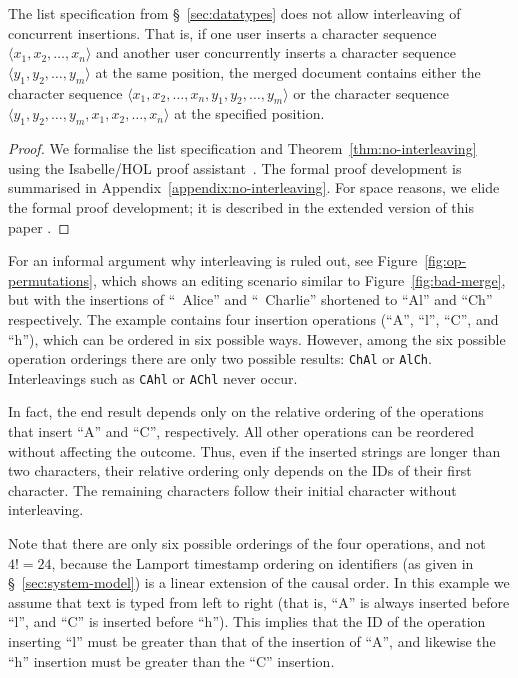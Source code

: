 \begin{theorem}\label{thm:no-interleaving}
    The list specification from \S~\ref{sec:datatypes} does not allow interleaving of concurrent insertions.
    That is, if one user inserts a character sequence $\langle x_1, x_2, \dots, x_n \rangle$ and another user concurrently inserts a character sequence $\langle y_1, y_2, \dots, y_m \rangle$ at the same position, the merged document contains either the character sequence $\langle x_1, x_2, \dots, x_n, y_1, y_2, \dots, y_m \rangle$ or the character sequence $\langle y_1, y_2, \dots, y_m, x_1, x_2, \dots, x_n \rangle$ at the specified position.
\end{theorem}
\begin{proof}
    We formalise the list specification and Theorem~\ref{thm:no-interleaving} using the Isabelle/HOL proof assistant~\cite{DBLP:conf/tphol/WenzelPN08}.
    \ifarxiv
        The formal proof development is summarised in Appendix~\ref{appendix:no-interleaving}.
    \else
        For space reasons, we elide the formal proof development; it is described in the extended version of this paper \cite{ExtendedVersion,AFP}.
    \fi
\end{proof}

For an informal argument why interleaving is ruled out, see Figure~\ref{fig:op-permutations}, which shows an editing scenario similar to Figure~\ref{fig:bad-merge}, but with the insertions of ``~Alice'' and ``~Charlie'' shortened to ``Al'' and ``Ch'' respectively.
The example contains four insertion operations (``A'', ``l'', ``C'', and ``h''), which can be ordered in six possible ways.
However, among the six possible operation orderings there are only two possible results: \texttt{ChAl} or \texttt{AlCh}.
Interleavings such as \texttt{CAhl} or \texttt{AChl} never occur.

In fact, the end result depends only on the relative ordering of the operations that insert ``A'' and ``C'', respectively.
All other operations can be reordered without affecting the outcome.
Thus, even if the inserted strings are longer than two characters, their relative ordering only depends on the IDs of their first character.
The remaining characters follow their initial character without interleaving.

Note that there are only six possible orderings of the four operations, and not $4! = 24$, because the Lamport timestamp ordering on identifiers (as given in \S~\ref{sec:system-model}) is a linear extension of the causal order.
In this example we assume that text is typed from left to right (that is, ``A'' is always inserted before ``l'', and ``C'' is inserted before ``h'').
This implies that the ID of the operation inserting ``l'' must be greater than that of the insertion of ``A'', and likewise the ``h'' insertion must be greater than the ``C'' insertion.


